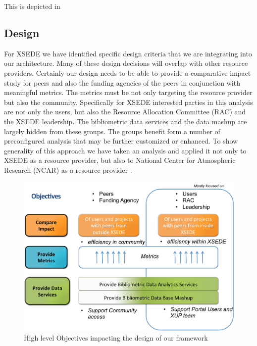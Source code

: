 \documentclass{sig-alternate}
\begin{document}
This is depicted in

\subsection{Design}


For XSEDE we have identified specific design criteria that we are integrating into our architecture. Many of these design decisions will overlap with other resource providers. Certainly our design needs to be able to provide a comparative impact study for peers and also the funding agencies of the peers in conjunction with meaningful metrics. The metrics must be not only targeting the resource provider but also the community. Specifically for XSEDE interested parties in this analysis are not only the users, but also the Resource Allocation Committee (RAC) and the XSEDE leadership. The bibliometric data services and the data mashup are largely hidden from these groups. The groups benefit form a number of preconfigured analysis that may be further customized or enhanced. To show generality of this approach we have taken an analysis and applied it not only to XSEDE as a resource provider, but also to National Center for Atmospheric Research (NCAR) as a resource provider \cite{www-ncar}.

\begin{figure}[htb] 
  \centering 
    \includegraphics[width=1.0\columnwidth]{images-new/objectives.pdf} 
    \caption{High level Objectives impacting the design of our framework}
    \label{F:objectives}
\end{figure} 
\end{document}
